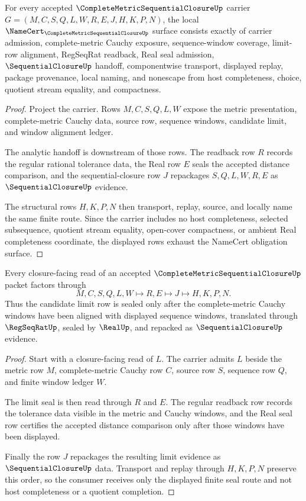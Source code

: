 \begin{theorem}
\label{thm:complete-metric-sequential-closure-namecert-obligations}
For every accepted $\CompleteMetricSequentialClosureUp$ carrier $G=(M,C,S,Q,L,W,R,E,J,H,K,P,N)$, the local $\NameCert_{\CompleteMetricSequentialClosureUp}$ surface consists exactly of carrier admission, complete-metric Cauchy exposure, sequence-window coverage, limit-row alignment, RegSeqRat readback, Real seal admission, $\SequentialClosureUp$ handoff, componentwise transport, displayed replay, package provenance, local naming, and nonescape from host completeness, choice, quotient stream equality, and compactness.
\end{theorem}
\begin{proof}
Project the carrier. Rows $M,C,S,Q,L,W$ expose the metric presentation, complete-metric Cauchy data, source row, sequence windows, candidate limit, and window alignment ledger.

The analytic handoff is downstream of those rows. The readback row $R$ records the regular rational tolerance data, the Real row $E$ seals the accepted distance comparison, and the sequential-closure row $J$ repackages $S,Q,L,W,R,E$ as $\SequentialClosureUp$ evidence.

The structural rows $H,K,P,N$ then transport, replay, source, and locally name the same finite route. Since the carrier includes no host completeness, selected subsequence, quotient stream equality, open-cover compactness, or ambient Real completeness coordinate, the displayed rows exhaust the NameCert obligation surface.
\end{proof}

\begin{theorem}
\label{thm:complete-metric-sequential-closure-limit-seal}
Every closure-facing read of an accepted $\CompleteMetricSequentialClosureUp$ packet factors through
$$
M,C,S,Q,L,W \longmapsto R,E \longmapsto J \longmapsto H,K,P,N .
$$
Thus the candidate limit row is sealed only after the complete-metric Cauchy windows have been aligned with displayed sequence windows, translated through $\RegSeqRatUp$, sealed by $\RealUp$, and repacked as $\SequentialClosureUp$ evidence.
\end{theorem}
\begin{proof}
Start with a closure-facing read of $L$. The carrier admits $L$ beside the metric row $M$, complete-metric Cauchy row $C$, source row $S$, sequence row $Q$, and finite window ledger $W$.

The limit seal is then read through $R$ and $E$. The regular readback row records the tolerance data visible in the metric and Cauchy windows, and the Real seal row certifies the accepted distance comparison only after those windows have been displayed.

Finally the row $J$ repackages the resulting limit evidence as $\SequentialClosureUp$ data. Transport and replay through $H,K,P,N$ preserve this order, so the consumer receives only the displayed finite seal route and not host completeness or a quotient completion.
\end{proof}

